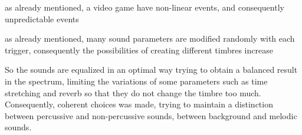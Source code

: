 	\begin{compactitem}
		\item as already mentioned, a video game have non-linear events, and consequently unpredictable events
		\item as already mentioned, many sound parameters are modified randomly with each trigger, consequently the possibilities of creating different timbres increase
	\end{compactitem}
	
	So the sounds are equalized in an optimal way trying to obtain a balanced result in the spectrum, limiting the variations of some parameters such as time stretching and reverb so that they do not change the timbre too much. Consequently, coherent choices was made, trying to maintain a distinction between percussive and non-percussive sounds, between background and melodic sounds.

